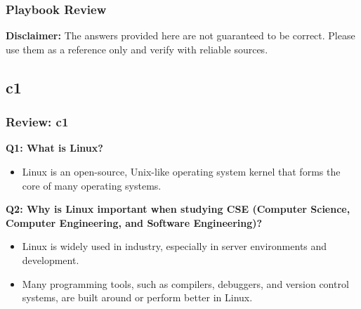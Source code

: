 \documentclass[
	11pt, %
]{beamer}
\begin{document}
\begin{frame}
	\frametitle{Playbook Review}

	\textbf{Disclaimer:} The answers provided here are not guaranteed to be correct. Please use them as a reference only and verify with reliable sources.


\end{frame}


\subsection{c1}

\begin{frame}
	\frametitle{Review: c1}

	\textbf{Q1: What is Linux?}

	\begin{itemize}
	    \item Linux is an open-source, Unix-like operating system kernel that forms the core of many operating systems.
	\end{itemize}

	\vspace{0.5cm}
	
	\textbf{Q2: Why is Linux important when studying CSE (Computer Science, Computer Engineering, and Software Engineering)?}

	\begin{itemize}
	    \item Linux is widely used in industry, especially in server environments and development.
	    \item Many programming tools, such as compilers, debuggers, and version control systems, are built around or perform better in Linux.
	\end{itemize}

\end{frame}

\end{document}
